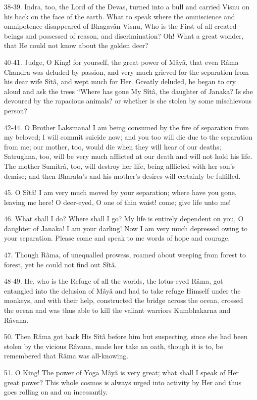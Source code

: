 38-39. Indra, too, the Lord of the Devas, turned into a bull and carried Visnu on his back on the face of the earth. What to speak where the omniscience and omnipotence disappeared of Bhagav\^an Visnu, Who is the First of all created beings and possessed of reason, and discrimination? Oh! What a great wonder, that He could not know about the golden deer?

40-41. Judge, O King! for yourself, the great power of M\^ay\^a, that even R\^ama Chandra was deluded by passion, and very much grieved for the separation from his dear wife S\^it\^a, and wept much for Her. Greatly deluded, he began to cry aloud and ask the trees ``Where has gone My S\^it\^a, the daughter of Janaka? Is she devoured by the rapacious animals? or whether is she stolen by some mischievous person?

42-44. O Brother Laksmana! I am being consumed by the fire of separation from my beloved; I will commit suicide now; and you too will die due to the separation from me; our mother, too, would die when they will hear of our deaths; Satrughna, too, will be very much afflicted at our death and will not hold his life. The mother Sumitr\^a, too, will destroy her life, being afflicted with her son's demise; and then Bharata's and his mother's desires will certainly be fulfilled.

45. O S\^it\^a! I am very much moved by your separation; where have you gone, leaving me here! O deer-eyed, O one of thin waist! come; give life unto me!

46. What shall I do? Where shall I go? My life is entirely dependent on you, O daughter of Janaka! I am your darling! Now I am very much depressed owing to your separation. Please come and speak to me words of hope and courage.

47. Though R\^ama, of unequalled prowess, roamed about weeping from forest to forest, yet he could not find out S\^it\^a.

48-49. He, who is the Refuge of all the worlds, the lotus-eyed R\^ama, got entangled into the delusion of M\^ay\^a and had to take refuge Himself under the monkeys, and with their help, constructed the bridge across the ocean, crossed the ocean and was thus able to kill the valiant warriors Kumbhakarna and R\^avana.

50. Then R\^ama got back His S\^it\^a before him but suspecting, since she had been stolen by the vicious R\^avana, made her take an oath, though it is to, be remembered that R\^ama was all-knowing.

51. O King! The power of Yoga M\^ay\^a is very great; what shall I speak of Her great power? This whole cosmos is always urged into activity by Her and thus goes rolling on and on incessantly.


